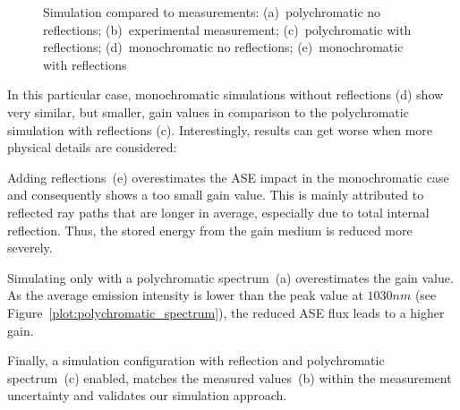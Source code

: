 \begin{figure}[H]
  \centerline{
    }
  \caption{Simulation compared to measurements:
    (a)~polychromatic no reflections;
    (b)~experimental measurement;
    (c)~polychromatic with reflections;
    (d)~monochromatic no reflections;
    (e)~monochromatic with reflections}
\label{plot:benchmark}
\end{figure}

In this particular case, monochromatic simulations without reflections
(d) show very similar, but smaller, gain values in comparison to the
polychromatic simulation with reflections (c).  Interestingly, results
can get worse when more physical details are considered:

Adding reflections~(e) overestimates the ASE impact in the
monochromatic case and consequently shows a too small gain value.
This is mainly attributed to reflected ray paths that are longer in
average, especially due to total internal reflection.  Thus, the
stored energy from the gain medium is reduced more severely.

Simulating only with a polychromatic spectrum~(a) overestimates the
gain value. As the average emission intensity is lower than the peak
value at $1030nm$ (see Figure~\ref{plot:polychromatic_spectrum}), the
reduced ASE flux leads to a higher gain.

Finally, a simulation configuration with reflection and polychromatic
spectrum~(c) enabled, matches the measured values~(b) within the
measurement uncertainty and validates our simulation approach.

